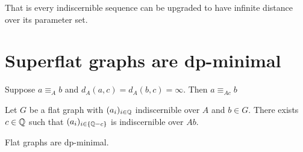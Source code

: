 \documentclass{amsart}
\begin{document}
That is every indiscernible sequence can be upgraded to have infinite distance over its parameter set.

\section{Superflat graphs are dp-minimal}

\begin{Lemma}
	Suppose $a \equiv_A b$ and $d_A(a, c) = d_A(b, c) = \infty$. Then $a \equiv_{Ac} b$
\end{Lemma}

\begin{Theorem}
	Let $G$ be a flat graph with $(a_i)_{i\in\mathbb{Q}}$ indiscernible over $A$ and $b \in G$. There exists $c \in \mathbb{Q}$ such that $(a_i)_{i\in\{\mathbb{Q} - c\}}$ is indiscernible over $Ab$.
\end{Theorem}

\begin{Corollary}
	Flat graphs are dp-minimal.
\end{Corollary}
\end{document}
